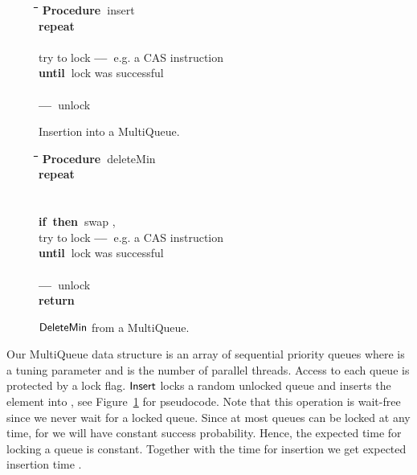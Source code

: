 \documentclass[a4paper,12pt]{article}
\newcommand{\Id}[1]{\ensuremath{\text{{\sf #1}}}}
\newenvironment{code}{\noindent\normalsize \begin{tabbing}\hspace{2em}\=\hspace{2em}\=\hspace{2em}\=\hspace{2em}\=\hspace{2em}\=\hspace{2em}\=\hspace{2em}\=\hspace{2em}\=\hspace{2em}\=\hspace{2em}\=\kill}{\end{tabbing}}
\newcommand{\Procedure}{{\bf Procedure\ }}
\newcommand{\Repeat}   {{\bf repeat\ }}
\newcommand{\Until}    {{\bf until\ }}
\newcommand{\If}       {{\bf if\ }}
\newcommand{\Then}     {{\bf then\ }}
\newcommand{\Return}   {{\bf return\ }}
\newcommand{\RRem}[1]   {\`{\bf --\hspace{0.5mm}--~}{\rm#1}}
\begin{document}
\begin{figure}[b]
\begin{code}
\Procedure insert\+\\
  \Repeat\+\\
    \\
    try to lock \RRem{e.g. a CAS instruction}\-\\
  \Until lock was successful\\
  \\
  \RRem{unlock}\\
\end{code}
\caption{\label{alg:insertMQ}Insertion into a MultiQueue.}
\end{figure}
\begin{figure}[t]
\begin{code}
\Procedure deleteMin\+\\
  \Repeat\+\\
    \\
    \\
    \If  \Then swap , \\
    try to lock \RRem{e.g. a CAS instruction}\-\\
  \Until lock was successful\\
  \\
  \RRem{unlock}\\
  \Return 
\end{code}
\caption{\label{alg:deleteMinMQ}\Id{DeleteMin} from a MultiQueue.}
\end{figure}


Our MultiQueue data structure is an array  of  sequential priority queues where  is a tuning parameter and  is the number of parallel threads. Access to each queue is protected by a lock flag. \Id{Insert} locks a random unlocked queue  and inserts the element into , see Figure~\ref{alg:insertMQ} for pseudocode. Note that this operation is wait-free since we never wait for a locked queue. Since at most  queues can be locked at any time, for  we will have constant success probability. Hence, the expected time for locking a queue is constant. Together with the time for insertion we get expected insertion time .
\end{document}

